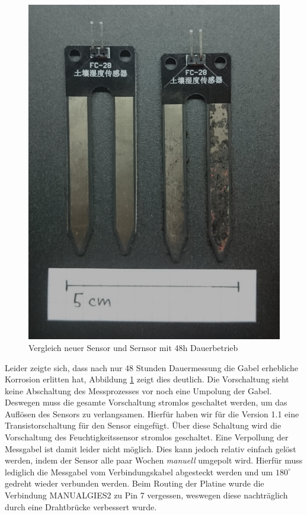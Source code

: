 \documentclass[]{IEEEtran}
\begin{document}
\begin{figure}
	\centering
	\includegraphics[width=0.8\linewidth]{bilder/_fechtesensorVergleich0.jpg}
	\caption{Vergleich neuer Sensor und Sernsor mit 48h Dauerbetrieb}
	\label{fig-SensorVergleich}
\end{figure}
Leider zeigte sich, dass nach nur 48 Stunden Dauermessung die Gabel erhebliche Korrosion erlitten hat, Abbildung \ref{fig-SensorVergleich} zeigt dies deutlich.
Die Vorschaltung sieht keine Abschaltung des Messprozesses vor noch eine Umpolung der Gabel. Deswegen muss die gesamte Vorschaltung stromlos geschaltet werden, um das Auflösen des Sensors zu verlangsamen. Hierfür haben wir für die Version 1.1 eine Transistorschaltung für den Sensor eingefügt. Über diese Schaltung wird die Vorschaltung des Feuchtigkeitssensor stromlos geschaltet. Eine Verpollung der Messgabel ist damit leider nicht möglich. Dies kann jedoch relativ einfach gelöst werden, indem der Sensor alle paar Wochen \emph{manuell} umgepolt wird. Hierfür muss lediglich die Messgabel vom Verbindungskabel abgesteckt werden und um \begin{math}180^{\circ}\end{math} gedreht wieder verbunden werden.
Beim Routing der Platine wurde die Verbindung MANUALGIES2 zu Pin 7 vergessen, weswegen diese nachträglich durch eine Drahtbrücke verbessert wurde.
	
\end{document}
